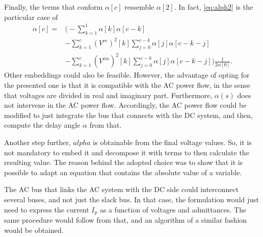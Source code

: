 \documentclass[conference]{IEEEtran}
\begin{document}
Finally, the terms that conform $\alpha[c]$ ressemble $\alpha[2]$. In fact, \eqref{eq:alph2} is the particular case of
\begin{equation}
  \begin{split}
  \alpha[c]=& \biggl(-\sum_{k=1}^1\alpha[k]\alpha[c-k]\\
  &-\sum_{k=1}^c(V^{re})^2[k]\sum_{j=0}^{c-k}\alpha[j]\alpha[c-k-j]\\
  &-\sum_{k=1}^c(V^{im})^2[k]\sum_{j=0}^{c-k}\alpha[j]\alpha[c-k-j]\biggr)\frac{1}{2\alpha[0]}.
  \end{split}
  \label{eq:alphc}
\end{equation}
Other embeddings could also be feasible. However, the advantage of opting for the presented one is that it is compatible with the AC power flow, in the sense that voltages are divided in real and imaginary part. Furthermore, $\alpha(s)$ does not intervene in the AC power flow. Accordingly, the AC power flow could be modified to just integrate the bus that connects with the DC system, and then, compute the delay angle $\alpha$ from that. 

Another step further, $alpha$ is obtainable from the final voltage values. So, it is not mandatory to embed it and decompose it with terms to then calculate the resulting value. The reason behind the adopted choice was to show that it is possible to adapt an equation that contains the absolute value of a variable. 

The AC bus that links the AC system with the DC side could interconnect several buses, and not just the slack bus. In that case, the formulation would just need to express the current $I_p$ as a function of voltages and admittances. The same procedure would follow from that, and an algorithm of a similar fashion would be obtained. 



\end{document}
